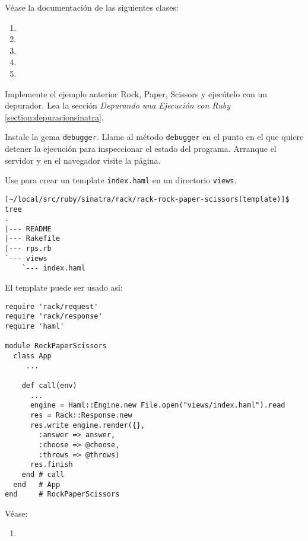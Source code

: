 
Véase la documentación de las siguientes clases:
\begin{enumerate}
\item 
{}
\item 
{}
\item 
{}
\item 
{}
\item 
{}
\end{enumerate}

Implemente el ejemplo anterior Rock, Paper, Scissors y ejecútelo con 
un depurador.
Lea la sección {\it Depurando una Ejecución con Ruby} \ref{section:depuracionsinatra}.

Instale la gema \verb|debugger|.
Llame al método \verb|debugger| en el punto en el que quiere detener la ejecución para inspeccionar el estado del programa.
Arranque el servidor y en el navegador visite la página.

\label{practica:rackandhaml}

Use 
para crear un template \verb|index.haml| en un directorio \verb|views|.
\begin{verbatim}
[~/local/src/ruby/sinatra/rack/rack-rock-paper-scissors(template)]$ tree
.
|--- README
|--- Rakefile
|--- rps.rb
`--- views
    `--- index.haml
\end{verbatim}
El template puede ser usado así:
\begin{verbatim}
require 'rack/request'
require 'rack/response'
require 'haml'

module RockPaperScissors
  class App 
     ...

    def call(env)
      ...
      engine = Haml::Engine.new File.open("views/index.haml").read
      res = Rack::Response.new 
      res.write engine.render({}, 
        :answer => answer, 
        :choose => @choose,
        :throws => @throws)
      res.finish
    end # call
  end   # App
end     # RockPaperScissors
\end{verbatim}

Véase:

\begin{enumerate}
\item 
{}
\end{enumerate}

